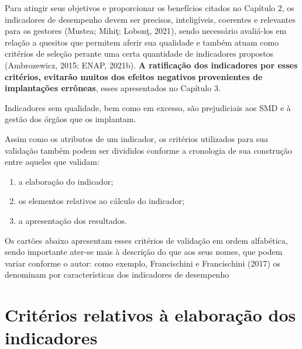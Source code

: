 \documentclass[
  letterpaper,
  DIV=11,
  numbers=noendperiod]{scrreprt}
\begin{document}
Para atingir seus objetivos e proporcionar os benefícios citados no
Capítulo 2, os indicadores de desempenho devem ser precisos,
inteligíveis, coerentes e relevantes para os gestores (Mustea; Mihiţ;
Lobonţ, 2021), sendo necessário avaliá-los em relação a quesitos que
permitem aferir sua qualidade e também atuam como critérios de seleção
perante uma certa quantidade de indicadores propostos (Ambrozewicz,
2015; ENAP, 2021b). \textbf{A ratificação dos indicadores por esses
critérios, evitarão muitos dos efeitos negativos} \textbf{provenientes
de implantações errôneas}, esses apresentados no Capítulo 3.

\begin{tcolorbox}[enhanced jigsaw, title=\textcolor{quarto-callout-important-color}{\faExclamation}\hspace{0.5em}{Alerta}, bottomrule=.15mm, arc=.35mm, bottomtitle=1mm, toprule=.15mm, coltitle=black, opacityback=0, colback=white, rightrule=.15mm, breakable, toptitle=1mm, leftrule=.75mm, titlerule=0mm, opacitybacktitle=0.6, colbacktitle=quarto-callout-important-color!10!white, left=2mm, colframe=quarto-callout-important-color-frame]

Indicadores sem qualidade, bem como em excesso, são prejudiciais aos SMD
e à gestão dos órgãos que os implantam.

\end{tcolorbox}

Assim como os atributos de um indicador, os critérios utilizados para
sua validação também podem ser divididos conforme a cronologia de sua
construção entre aqueles que validam:

\begin{enumerate}
\def\labelenumi{\arabic{enumi}.}
\item
  a elaboração do indicador;
\item
  os elementos relativos ao cálculo do indicador;
\item
  a apresentação dos resultados.
\end{enumerate}

Os cartões abaixo apresentam esses critérios de validação em ordem
alfabética, sendo importante ater-se mais à descrição do que aos seus
nomes, que podem variar conforme o autor: como exemplo, Francischini e
Francischini (2017) os denominam por características dos indicadores de
desempenho

\hypertarget{crituxe9rios-relativos-uxe0-elaborauxe7uxe3o-dos-indicadores}{%
\section{\texorpdfstring{\textbf{Critérios relativos à elaboração dos
indicadores}}{Critérios relativos à elaboração dos indicadores}}\label{crituxe9rios-relativos-uxe0-elaborauxe7uxe3o-dos-indicadores}}
\end{document}
